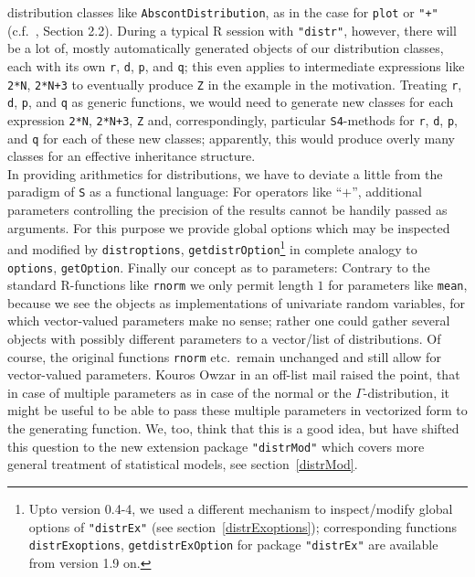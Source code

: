 \documentclass[11pt]{article}
\newcommand{\code}[1]{{\tt #1}}
\newcommand{\pkg}[1]{{\tt "#1"}}
\begin{document}
distribution classes like  \code{AbscontDistribution}, as in the case for
\code{plot} or \code{"+"} (c.f.\ \cite{K:R:S:04}, Section 2.2).
During a typical {\sf R} session with \pkg{distr}, however, there will be a lot
of, mostly automatically generated objects of our distribution classes, each
with its own \code{r}, \code{d}, \code{p}, and \code{q}; this even applies to
intermediate expressions like \code{2*N}, \code{2*N+3} to eventually produce
\code{Z} in the example in the motivation. Treating \code{r}, \code{d},
\code{p}, and \code{q} as generic functions, we would need to generate new
classes for each expression \code{2*N}, \code{2*N+3}, \code{Z} and,
correspondingly, particular {\tt S4}-methods for \code{r}, \code{d}, \code{p},
and \code{q} for each of these new classes; apparently, this would produce
overly many classes for an effective inheritance structure. \\
In providing arithmetics for distributions, we have to deviate a little from
the paradigm of {\tt S} as a functional language: For operators like ``$+$'',
additional parameters controlling the precision of the results cannot be handily
passed as arguments. For this purpose we provide global options which may be
inspected and modified by \code{distroptions},
\code{getdistrOption}\footnote{Upto version 0.4-4, we used a different mechanism
to inspect/modify global options of \pkg{distrEx} (see
section~\ref{distrExoptions}); corresponding functions \code{distrExoptions},
\code{getdistrExOption} for package \pkg{distrEx} are available from version
1.9 on.} in complete analogy to \code{options}, \code{getOption}.
%
Finally our concept as to parameters: Contrary to the standard {\sf R}-functions
like \code{rnorm} we only permit length $1$ for parameters like \code{mean},
because we see the objects as implementations of univariate random variables,
for which vector-valued parameters make no sense; rather one could gather
several objects with possibly different parameters to a vector/list of
distributions. Of course, the original functions \code{rnorm} etc.\ remain
unchanged and still allow for vector-valued parameters.
Kouros Owzar  in an off-list mail raised the point, that in case of multiple
parameters as in case of the normal or the $\Gamma$-distribution, it might be
useful to be able to pass these multiple parameters in vectorized form to the
generating function. We, too, think that this is a good idea, but have
shifted this question to the new extension package \pkg{distrMod} which covers
more general treatment of statistical models, see section~\ref{distrMod}.
\end{document}
